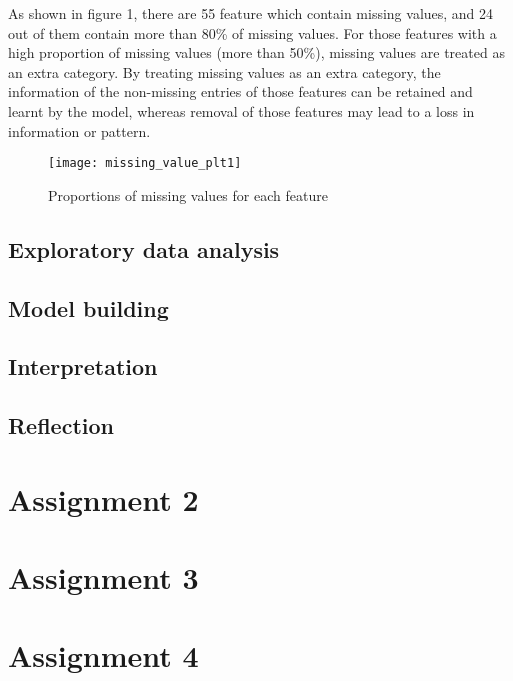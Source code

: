 \documentclass[12pt]{article}
\begin{document}
As shown in figure 1, there are 55 feature which contain missing values, and 24 out of them contain more than 80\% of missing values. For those features with a high proportion of missing values (more than 50\%), missing values are treated as an extra category. By treating missing values as an extra category, the information of the non-missing entries of those features can be retained and learnt by the model, whereas removal of those features may lead to a loss in information or pattern.  

\begin{figure}[h]
\centering
\texttt{[image: missing\_value\_plt1]}
\caption{Proportions of missing values for each feature}
\end{figure}

\subsection*{Exploratory data analysis}

\subsection*{Model building}

\subsection*{Interpretation}

\subsection*{Reflection}

\section*{Assignment 2}

\section*{Assignment 3}

\section*{Assignment 4}
\end{document}
